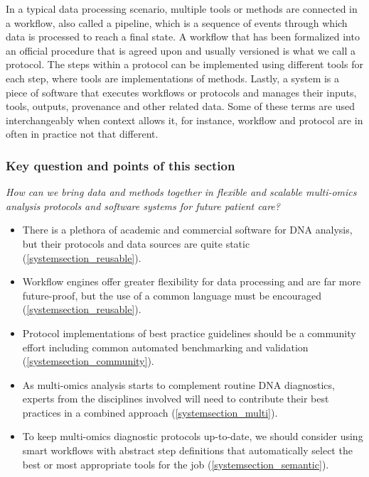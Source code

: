 \begin{tcolorbox}[width=\textwidth,colframe=deeporange,colback={white},title={Box 4: Clarification of terminology},colbacktitle=white,coltitle=black,enhanced]
In a typical data processing scenario, multiple tools or methods are connected in a workflow, also called a pipeline, which is a sequence of events through which data is processed to reach a final state.
A workflow that has been formalized into an official procedure that is agreed upon and usually versioned is what we call a protocol.
The steps within a protocol can be implemented using different tools for each step, where tools are implementations of methods.
Lastly, a system is a piece of software that executes workflows or protocols and manages their inputs, tools, outputs, provenance and other related data.
Some of these terms are used interchangeably when context allows it, for instance, workflow and protocol are in often in practice not that different.
\end{tcolorbox}

\subsubsection*{Key question and points of this section}

\textsl{How can we bring data and methods together in flexible and scalable multi-omics analysis protocols and software systems for future patient care?}

\begin{tcolorbox}[width=\textwidth,colframe=deeporange,colback={white},title={Key points},colbacktitle=deeporange,coltitle=black,enhanced]
  \begin{itemize}
    \item There is a plethora of academic and commercial software for DNA analysis, but their protocols and data sources are quite static (\ref{systemsection_reusable}).
    \item Workflow engines offer greater flexibility for data processing and are far more future-proof, but the use of a common language must be encouraged (\ref{systemsection_reusable}).
    \item Protocol implementations of best practice guidelines should be a community effort including common automated benchmarking and validation (\ref{systemsection_community}).
    \item As multi-omics analysis starts to complement routine DNA diagnostics, experts from the disciplines involved will need to contribute their best practices in a combined approach (\ref{systemsection_multi}).
    \item To keep multi-omics diagnostic protocols up-to-date, we should consider using smart workflows with abstract step definitions that automatically select the best or most appropriate tools for the job (\ref{systemsection_semantic}).
  \end{itemize}
\end{tcolorbox}

